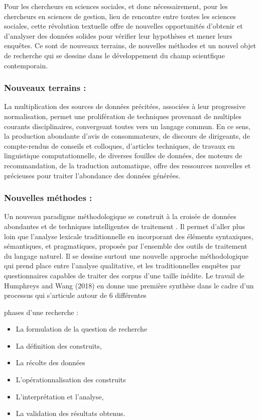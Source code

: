 \documentclass[
  letterpaper,
  DIV=11,
  numbers=noendperiod]{scrreprt}
\providecommand{\tightlist}{%
  \setlength{\itemsep}{0pt}\setlength{\parskip}{0pt}}\usepackage{longtable,booktabs,array}
\begin{document}
Pour les chercheurs en sciences sociales, et donc nécessairement, pour
les chercheurs en sciences de gestion, lieu de rencontre entre toutes
les sciences sociales, cette révolution textuelle offre de nouvelles
opportunités d'obtenir et d'analyser des données solides pour vérifier
leur hypothèses et mener leurs enquêtes. Ce sont de nouveaux terrains,
de nouvelles méthodes et un nouvel objet de recherche qui se dessine
dans le développement du champ scientfique contemporain.

\subsubsection{Nouveaux terrains :}\label{nouveaux-terrains}

La multiplication des sources de données précitées, associées à leur
progressive normalisation, permet une prolifération de techniques
provenant de multiples courants disciplinaires, convergeant toutes vers
un langage commun. En ce sens, la production abondante d'avis de
consommateurs, de discours de dirigeants, de compte-rendus de conseils
et colloques, d'articles techniques, de travaux en linguistique
computationnelle, de diverses fouilles de données, des moteurs de
recommandation, de la traduction automatique, offre des ressources
nouvelles et précieuses pour traiter l'abondance des données générées.

\subsubsection{Nouvelles méthodes :}\label{nouvelles-muxe9thodes}

Un nouveau paradigme méthodologique se construit à la croisée de données
abondantes et de techniques intelligentes de traitement . Il permet
d'aller plus loin que l'analyse lexicale traditionnelle en incorporant
des éléments syntaxiques, sémantiques, et pragmatiques, proposés par
l'ensemble des outils de traitement du langage naturel. Il se dessine
surtout une nouvelle approche méthodologique qui prend place entre
l'analyse qualitative, et les traditionnelles enquêtes par
questionnaires capables de traiter des corpus d'une taille inédite. Le
travail de Humphreys and Wang (2018) en donne une première synthèse dans
le cadre d'un processus qui s'articule autour de 6 différentes

phases d'une recherche :

\begin{itemize}
\tightlist
\item
  La formulation de la question de recherche
\item
  La définition des construits,
\item
  La récolte des données
\item
  L'opérationnalisation des construits
\item
  L'interprétation et l'analyse,
\item
  La validation des résultats obtenus.
\end{itemize}
\end{document}
